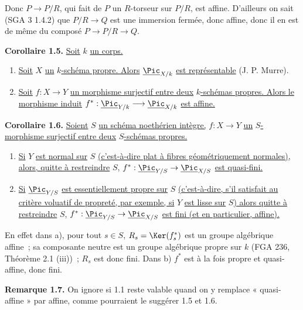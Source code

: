 
Donc \(P\to P/R\), qui fait de \(P\) un \(R\)-torseur sur \(P/R\), est affine. D'ailleurs on sait (SGA 3 1.4.2) que \(P/R\to Q\) est une immersion fermée, donc affine, donc il en est de même du composé \(P\to P/R\to Q\).

\textbf{Corollaire 1.5.} \uline{Soit} \(k\) \uline{un corps.}
\begin{enumerate}[label=\alph*)]
\item \uline{Soit} \(X\) \uline{un} \(k\)\uline{-schéma propre. Alors} \(\underline{\Pic}_{X/k}\) \uline{est représentable} (J. P. Murre).
\item \uline{Soit} \(f:X\to Y\) \uline{un morphisme surjectif entre deux} \(k\)\uline{-schémas propres. Alors le morphisme induit} \(f^*:\underline{\Pic}_{Y/k}\longrightarrow \underline{\Pic}_{X/k}\) \uline{est affine.}
\end{enumerate}

\textbf{Corollaire 1.6.} \uline{Soient} \(S\) \uline{un schéma noethérien intègre,} \(f:X\to Y\) \uline{un} \(S\)\uline{-morphisme surjectif entre deux} \(S\)\uline{-schémas propres.}
\begin{enumerate}[label=\alph*)]
\item \uline{Si} \(Y\) \uline{est normal sur} \(S\) \uline{(c'est-à-dire plat à fibres géométriquement normales), alors, quitte à restreindre} \(S\), \(f^*:\underline{\Pic}_{Y/S}\to\underline{\Pic}_{X/S}\) \uline{est quasi-fini.}
\item \uline{Si} \(\underline{\Pic}_{Y/S}\) \uline{est essentiellement propre sur} \(S\) \uline{(c'est-à-dire, s'il satisfait au critère voluatif de propreté, par exemple, si} \(Y\) \uline{est lisse sur} \(S\)\uline{) alors quitte à restreindre} \(S\), \(f^*:\underline{\Pic}_{Y/S}\to\underline{\Pic}_{X/S}\) \uline{est fini (et en particulier, affine).}
\end{enumerate}

En effet dans a), pour tout \(s\in S\), \(R_s=\Ker(f_s^*)\) est un groupe algébrique affine~; sa composante neutre est un groupe algébrique propre sur \(k\) (FGA 236, Théorème 2.1 (iii))~; \(R_s\) est donc fini. Dans b) \(f^*\) est à la fois propre et quasi-affine, donc fini.

\textbf{Remarque 1.7.} On ignore si 1.1 reste valable quand on y remplace « quasi-affine » par affine, comme pourraient le suggérer 1.5 et 1.6.

